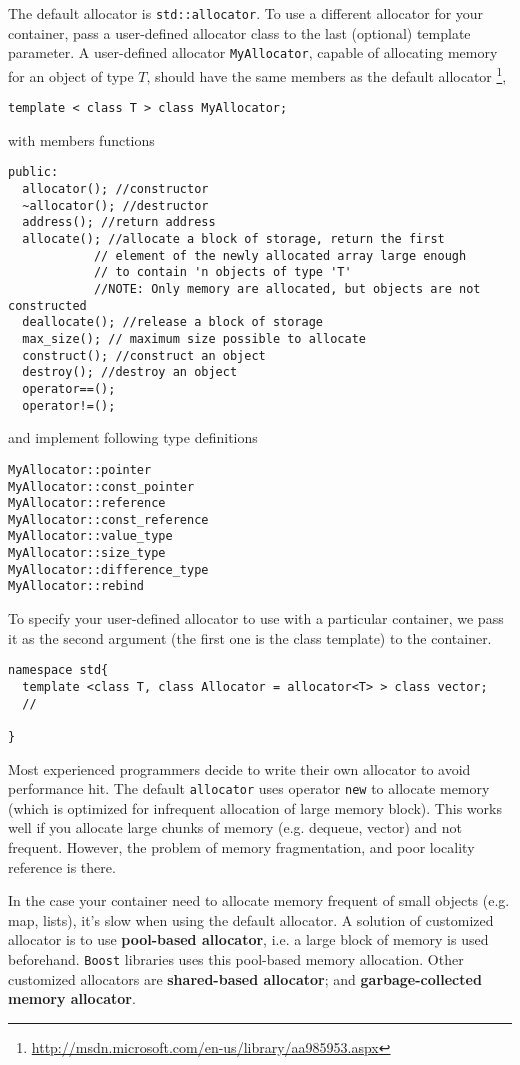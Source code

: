 The default allocator is \verb!std::allocator!. To use a different allocator for
your container, pass a user-defined allocator class to the last (optional)
template parameter. A user-defined allocator \verb!MyAllocator!, capable of
allocating memory for an object of type $T$, should have the same members as the
default allocator
\footnote{\url{http://msdn.microsoft.com/en-us/library/aa985953.aspx}},
\begin{lstlisting}
template < class T > class MyAllocator;
\end{lstlisting}
with members functions
\begin{lstlisting}
public:
  allocator(); //constructor
  ~allocator(); //destructor
  address(); //return address
  allocate(); //allocate a block of storage, return the first
            // element of the newly allocated array large enough
            // to contain 'n objects of type 'T' 
            //NOTE: Only memory are allocated, but objects are not constructed
  deallocate(); //release a block of storage
  max_size(); // maximum size possible to allocate
  construct(); //construct an object
  destroy(); //destroy an object
  operator==();
  operator!=();
\end{lstlisting}
and implement following type definitions
\begin{verbatim}
MyAllocator::pointer
MyAllocator::const_pointer
MyAllocator::reference
MyAllocator::const_reference
MyAllocator::value_type
MyAllocator::size_type
MyAllocator::difference_type
MyAllocator::rebind
\end{verbatim}
To specify your user-defined allocator to use with a particular container, we
pass it as the second argument (the first one is the class template) to the
container.
\begin{lstlisting}
namespace std{ 
  template <class T, class Allocator = allocator<T> > class vector;
  //
  
}
\end{lstlisting}

Most experienced programmers decide to write their own allocator to avoid
performance hit. The default \verb!allocator! uses operator \verb!new! to
allocate memory (which is optimized for infrequent allocation of large memory
block). This works well if you allocate large chunks of memory (e.g. dequeue,
vector) and not frequent. However, the problem of memory fragmentation, and poor
locality reference is there.

In the case your container need to allocate memory frequent of small objects
(e.g. map, lists), it's slow when using the default allocator. A solution of
customized allocator is to use {\bf pool-based allocator}, i.e. a large
block of memory is used beforehand. \verb!Boost! libraries uses this pool-based memory
allocation. Other customized allocators are {\bf shared-based allocator}; and
{\bf garbage-collected memory allocator}.


